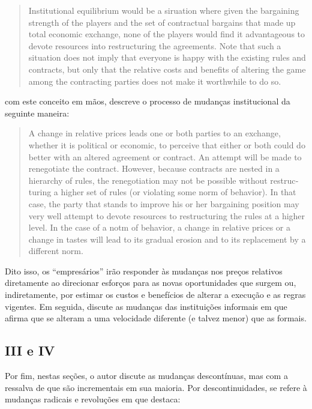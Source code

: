 \begin{quotation}
	 Institutional equilibrium would be a siruation where
	given the bargaining strength of the players and the set of contractual
	bargains that made up total economic exchange, none of the players
	would find it advantageous to devote resources into restructuring the
	agreements. Note that such a situation does not imply that everyone is
	happy with the existing rules and contracts, but only that the relative
	costs and benefits of altering the game among the contracting parties does
	not make it worthwhile to do so.
\end{quotation}
com este conceito em mãos, descreve o processo de mudanças institucional da seguinte maneira:
\begin{quotation}
	A
	change in relative prices leads one or both parties to an exchange,
	whether it is political or economic, to perceive that either or both could
	do better with an altered agreement or contract. An attempt will be made
	to renegotiate the contract. However, because contracts are nested in a
	hierarchy of rules, the renegotiation may not be possible without restruc­
	turing a higher set of rules (or violating some norm of behavior). In that
	case, the party that stands to improve his or her bargaining position may
	very well attempt to devote resources to restructuring the rules at a higher
	level. In the case of a notm of behavior, a change in relative prices or a
	change in tastes will lead to its gradual erosion and to its replacement by
	a different norm.
\end{quotation}
Dito isso, os ``empresários'' irão responder às mudanças nos preços relativos diretamente ao direcionar esforços para as novas oportunidades que surgem ou, indiretamente, por estimar os custos e benefícios de alterar a execução e as regras vigentes. Em seguida, discute as mudanças das instituições informais em que afirma que se alteram a uma velocidade diferente (e talvez menor) que as formais.

\subsection*{III e IV}

Por fim, nestas seções, o autor discute as mudanças descontínuas, mas com a ressalva de que são incrementais em sua maioria. Por descontinuidades, \autor se refere à mudanças radicais e revoluções em que destaca:

